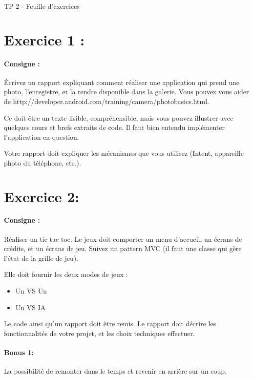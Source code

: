 \documentclass{article}
\begin{document}
\begin{center}
\large\sc TP 2 - Feuille d'exercices
\end{center}

\section{Exercice 1 :} 

\paragraph{Consigne : } Écrivez un rapport expliquant comment réaliser une application qui prend une photo, l'enregistre, et la rendre disponible dans la galerie. Vous pouvez vous aider de http://developer.android.com/training/camera/photobasics.html.

Ce doit être un texte lisible, compréhensible, mais vous pouvez illustrer avec quelques cours et brefs extraits de code.
Il faut bien entendu implémenter l'application en question.

Votre rapport doit expliquer les mécanismes que vous utilisez (Intent, appareille photo du téléphone, etc.).


\section{Exercice 2:}
\paragraph{Consigne :} Réaliser un tic tac toe. Le jeux doit comporter un menu d’accueil, un écrans de crédits, et un écrans de jeu. Suivez un pattern MVC (il faut une classe qui gère l'état de la grille de jeu).

Elle doit fournir les deux modes de jeux :
\begin{itemize}
\item Un VS Un
\item Un VS IA
\end{itemize}

Le code ainsi qu'un rapport doit être remis. Le rapport doit décrire les fonctionnalités de votre projet, et les choix techniques effectuer.


\paragraph{Bonus 1:} La possibilité de remonter dans le temps et revenir en arrière sur un coup.
\end{document}
